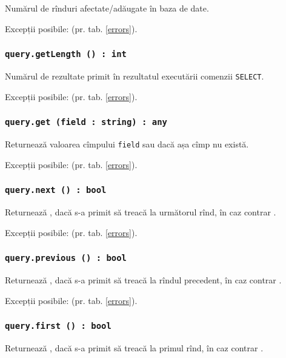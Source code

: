 Numărul de rînduri afectate/adăugate în baza de date.

Excepții posibile:  (pr. tab. \ref{errors}).

\subsubsection{\texttt{query.getLength () : int}}

Numărul de rezultate primit în rezultatul executării comenzii \texttt{SELECT}.

Excepții posibile:  (pr. tab. \ref{errors}).

\subsubsection{\texttt{query.get (field : string) : any}}

Returnează valoarea cîmpului \texttt{field} sau \void{} dacă așa cîmp nu există.

Excepții posibile:  (pr. tab. \ref{errors}).

\subsubsection{\texttt{query.next () : bool}}

Returnează \true, dacă s-a primit să treacă la următorul rînd, în caz contrar \false.

Excepții posibile:  (pr. tab. \ref{errors}).

\subsubsection{\texttt{query.previous () : bool}}

Returnează \true, dacă s-a primit să treacă la rîndul precedent, în caz contrar \false.

Excepții posibile:  (pr. tab. \ref{errors}).

\subsubsection{\texttt{query.first () : bool}}

Returnează \true, dacă s-a primit să treacă la primul rînd, în caz contrar \false.

